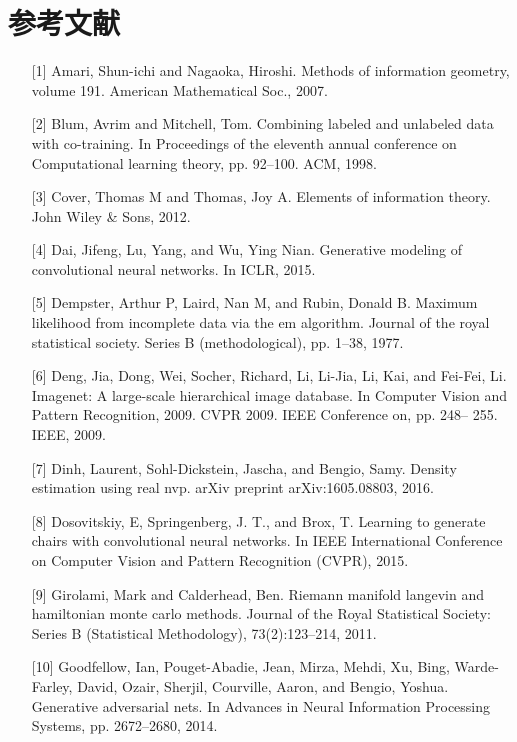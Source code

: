 \newpage

\section{参考文献}

\begin{itemize}
\item [{[}1{]}] Amari, Shun-ichi and Nagaoka, Hiroshi. Methods of information geometry, volume 191. American Mathematical Soc., 2007.
\item [{[}2{]}] Blum, Avrim and Mitchell, Tom. Combining labeled and unlabeled data with co-training. In Proceedings of the eleventh annual conference on Computational learning theory, pp. 92–100. ACM, 1998.
\item [{[}3{]}] Cover, Thomas M and Thomas, Joy A. Elements of information theory. John Wiley \& Sons, 2012.
\item [{[}4{]}] Dai, Jifeng, Lu, Yang, and Wu, Ying Nian. Generative modeling of convolutional neural networks. In ICLR, 2015.
\item [{[}5{]}] Dempster, Arthur P, Laird, Nan M, and Rubin, Donald B. Maximum likelihood from incomplete data via the em algorithm. Journal of the royal statistical society. Series B (methodological), pp. 1–38, 1977.
\item [{[}6{]}] Deng, Jia, Dong, Wei, Socher, Richard, Li, Li-Jia, Li, Kai, and Fei-Fei, Li. Imagenet: A large-scale hierarchical image database. In Computer Vision and Pattern Recognition, 2009. CVPR 2009. IEEE Conference on, pp. 248– 255. IEEE, 2009.
\item [{[}7{]}] Dinh, Laurent, Sohl-Dickstein, Jascha, and Bengio, Samy. Density estimation using real nvp. arXiv preprint arXiv:1605.08803, 2016.
\item [{[}8{]}] Dosovitskiy, E, Springenberg, J. T., and Brox, T. Learning to generate chairs with convolutional neural networks. In IEEE International Conference on Computer Vision and Pattern Recognition (CVPR), 2015.
\item [{[}9{]}] Girolami, Mark and Calderhead, Ben. Riemann manifold langevin and hamiltonian monte carlo methods. Journal of the Royal Statistical Society: Series B (Statistical Methodology), 73(2):123–214, 2011.
\item [{[}10{]}] Goodfellow, Ian, Pouget-Abadie, Jean, Mirza, Mehdi, Xu, Bing, Warde-Farley, David, Ozair, Sherjil, Courville, Aaron, and Bengio, Yoshua. Generative adversarial nets. In Advances in Neural Information Processing Systems, pp. 2672–2680, 2014.

\end{itemize}
